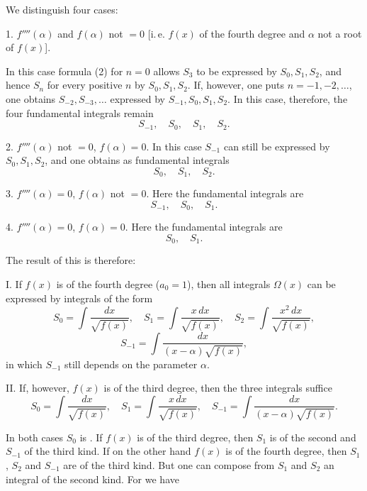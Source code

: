 
We distinguish four cases:

1. $f''''(\alpha)$ and $f(\alpha)$ not $=0$ [i.\,e. $f(x)$ of the fourth degree and $\alpha$ not a root of $f(x)$].

In this case formula (2) for $n=0$ allows $S_3$ to be expressed by $S_0, S_1, S_2$, and hence $S_n$ for every positive $n$ by $S_0, S_1, S_2$. If, however, one puts $n=-1,-2,\ldots$, one obtains $S_{-2}, S_{-3}, \ldots$ expressed by $S_{-1}, S_0, S_1, S_2$. In this case, therefore, the four fundamental integrals remain
\[
S_{-1}, \quad S_0, \quad S_1, \quad S_2.
\]

2. $f''''(\alpha)$ not $=0$, $f(\alpha)=0$. In this case $S_{-1}$ can still be expressed by $S_0, S_1, S_2$, and one obtains as fundamental integrals
\[
S_0, \quad S_1, \quad S_2.
\]

3. $f''''(\alpha)=0$, $f(\alpha)$ not $=0$. Here the fundamental integrals are
\[
S_{-1}, \quad S_0, \quad S_1.
\]

4. $f''''(\alpha)=0$, $f(\alpha)=0$. Here the fundamental integrals are
\[
S_0, \quad S_1.
\]

The result of this is therefore:

I. If $f(x)$ is of the fourth degree ($a_0=1$), then all integrals $\Omega(x)$ can be expressed by integrals of the form
\[
S_0 = \int \frac{dx}{\sqrt{f(x)}}, \quad S_1 = \int \frac{x\,dx}{\sqrt{f(x)}}, \quad S_2 = \int \frac{x^2\,dx}{\sqrt{f(x)}},
\]
\[
S_{-1} = \int \frac{dx}{(x-\alpha)\sqrt{f(x)}},
\]
in which $S_{-1}$ still depends on the parameter $\alpha$.

II. If, however, $f(x)$ is of the third degree, then the three integrals suffice
\[
S_0 = \int \frac{dx}{\sqrt{f(x)}}, \quad S_1 = \int \frac{x\,dx}{\sqrt{f(x)}}, \quad S_{-1} = \int \frac{dx}{(x-\alpha)\sqrt{f(x)}}.
\]

In both cases $S_0$ is . If $f(x)$ is of the third degree, then $S_1$ is of the second and $S_{-1}$ of the third kind. If on the other hand $f(x)$ is of the fourth degree, then $S_1$, $S_2$ and $S_{-1}$ are of the third kind. But one can compose from $S_1$ and $S_2$ an integral of the second kind. For we have
